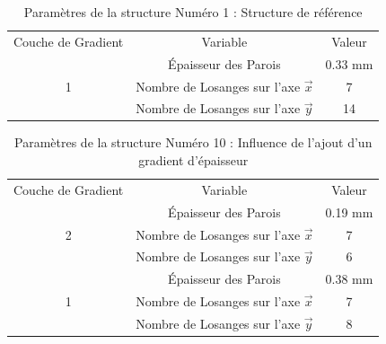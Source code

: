 \documentclass[a4paper]{article}
\begin{document}
	\begin{table}[H]
		\centering
		\begin{tabular}{|c|c|c|}
			\hline
			\rowcolor{Gray}
			\multicolumn{3}{c}{Structure de Référence : Structure 1}\\\hline
			\rowcolor{Gray}
			Couche de Gradient & Variable & Valeur\\
			\hline\hline
			& \textcolor[rgb]{0,0.5,0}{Épaisseur des Parois} & \textcolor[rgb]{0,0.5,0}{0.33 mm}\\
			\textcolor[rgb]{0,0.5,0}{1} & \textcolor[rgb]{0,0.5,0}{Nombre de Losanges sur l'axe $\vec{x}$} & \textcolor[rgb]{0,0.5,0}{7}\\
			& \textcolor[rgb]{0,0.5,0}{Nombre de Losanges sur l'axe $\vec{y}$} & \textcolor[rgb]{0,0.5,0}{14}\\
			\hline
		\end{tabular}
		\caption{Paramètres de la structure Numéro 1 : Structure de référence}
	\end{table}
	
	\begin{table}[H]
		\centering
		\begin{tabular}{|c|c|c|}
			\hline
			\rowcolor{Gray}
			\multicolumn{3}{c}{Structure avec gradient d'épaisseur : Structure 10}\\\hline
			\rowcolor{Gray}
			Couche de Gradient & Variable & Valeur\\
			\hline\hline
			& \textcolor[rgb]{1,0,0}{Épaisseur des Parois} & \textcolor[rgb]{1,0,0}{0.19 mm}\\
			\textcolor[rgb]{1,0,0}{2} & \textcolor[rgb]{1,0,0}{Nombre de Losanges sur l'axe $\vec{x}$} & \textcolor[rgb]{1,0,0}{7}\\
			& \textcolor[rgb]{1,0,0}{Nombre de Losanges sur l'axe $\vec{y}$} & \textcolor[rgb]{1,0,0}{6}\\
			\hline
			& \textcolor[rgb]{0,0.5,0}{Épaisseur des Parois} & \textcolor[rgb]{0,0.5,0}{0.38 mm}\\
			\textcolor[rgb]{0,0.5,0}{1} & \textcolor[rgb]{0,0.5,0}{Nombre de Losanges sur l'axe $\vec{x}$} & \textcolor[rgb]{0,0.5,0}{7}\\
			& \textcolor[rgb]{0,0.5,0}{Nombre de Losanges sur l'axe $\vec{y}$} & \textcolor[rgb]{0,0.5,0}{8}\\
			\hline
		\end{tabular}
		\caption{Paramètres de la structure Numéro 10 : Influence de l'ajout d'un gradient d'épaisseur}
	\end{table}
	
\end{document}
